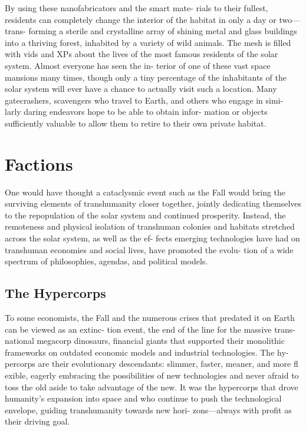 By using these nanofabricators and the smart mate-
rials to their fullest, residents can completely change 
the interior of the habitat in only a day or two—trans-
forming a sterile and crystalline array of shining metal 
and glass buildings into a thriving forest, inhabited by 
a variety of wild animals. The mesh is filled with vids 
and XPs about the lives of the most famous residents 
of the solar system. Almost everyone has seen the in-
terior of one of these vast space mansions many times, 
though only a tiny percentage of the inhabitants of 
the solar system will ever have a chance to actually 
visit such a location. Many gatecrashers, scavengers 
who travel to Earth, and others who engage in simi-
larly daring endeavors hope to be able to obtain infor-
mation or objects sufficiently valuable to allow them 
to retire to their own private habitat.

\section{Factions}

One would have thought a cataclysmic event such 
as the Fall would bring the surviving elements of 
transhumanity closer together, jointly dedicating 
themselves to the repopulation of the solar system 
and continued prosperity. Instead, the remoteness and 
physical isolation of transhuman colonies and habitats 
stretched across the solar system, as well as the ef-
fects emerging technologies have had on transhuman 
economies and social lives, have promoted the evolu-
tion of a wide spectrum of philosophies, agendas, and 
political models.

\subsection{The Hypercorps}

To some economists, the Fall and the numerous crises 
that predated it on Earth can be viewed as an extinc-
tion event, the end of the line for the massive trans-
national megacorp dinosaurs, financial giants that 
supported their monolithic frameworks on outdated 
economic models and industrial technologies. The hy-
percorps are their evolutionary descendants: slimmer, 
faster, meaner, and more fl exible, eagerly embracing 
the possibilities of new technologies and never afraid 
to toss the old aside to take advantage of the new. It 
was the hypercorps that drove humanity's expansion 
into space and who continue to push the technological 
envelope, guiding transhumanity towards new hori-
zons—always with profit as their driving goal.

